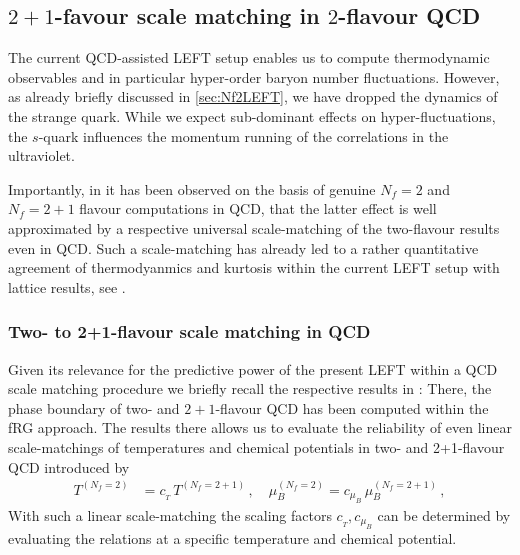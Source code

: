 \documentclass[%
reprint,
superscriptaddress,
showpacs,preprintnumbers,
amsmath,amssymb,
aps,
prd,
]{revtex4-1}
\begin{document}
\subsection{$2+1$-favour scale matching in $2$-flavour QCD}\label{subsec:scale}
	
The current QCD-assisted LEFT setup enables us to compute thermodynamic observables and in particular hyper-order baryon number fluctuations. However, as already briefly discussed in \autoref{sec:Nf2LEFT}, we have dropped the dynamics of the strange quark. While we expect sub-dominant effects on hyper-fluctuations, the $s$-quark influences the momentum running of the correlations in the ultraviolet. 
	
Importantly, in \cite{Fu:2019hdw} it has been observed on the basis of genuine $N_f=2$ and $N_f=2+1$ flavour computations in QCD, that the latter effect is well approximated by a respective universal scale-matching of the two-flavour results even in QCD. Such a scale-matching has already led to a rather quantitative agreement of thermodyanmics and kurtosis within the current LEFT setup with lattice results, see \cite{Fu:2015amv, Fu:2015naa, Fu:2016tey}. 
	
\subsubsection{Two- to 2+1-flavour scale matching in QCD}	
Given its relevance for the predictive power of the present LEFT within a QCD scale matching procedure we briefly recall the respective results in \cite{Fu:2019hdw}: There, the phase boundary of two- and $2+1$-flavour QCD has been computed within the fRG approach. The results there allows us to evaluate the reliability of even linear scale-matchings of temperatures and chemical potentials in two- and 2+1-flavour QCD introduced by 
%
\begin{align}
T^{(N_f=2)} &=c_{_{T}}\,T^{(N_f=2+1)} \,, \quad \mu_B^{(N_f=2)} =c_{\mu_B}\,\mu_{B}^{(N_f=2+1)} \,,\label{eq:rescale}
\end{align}
%
With such a linear scale-matching the scaling factors $c_{_{T}}, c_{\mu_B}$ can be determined by evaluating the relations at a specific temperature and chemical potential. 
\end{document}
